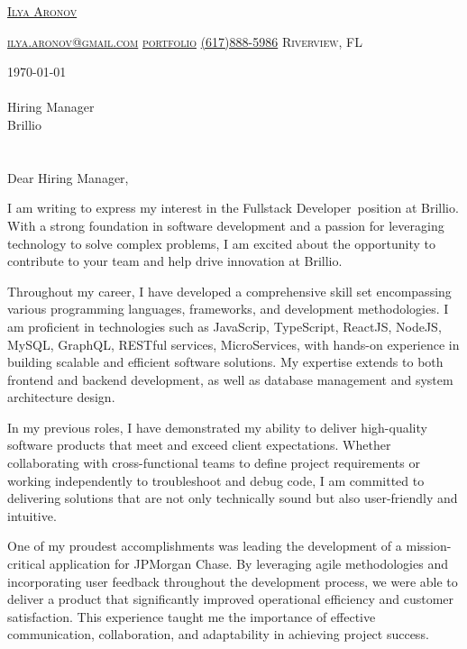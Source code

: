 \documentclass[11pt]{letter}
\makeatletter
\def\myname{Ilya Aronov}
\def\myemail{ilya.aronov@gmail.com}
\def\mylinkedin{ilya-aronov-b488a965}
\def\portfolio{https://imaronov.github.io/}
\def\myphone{(617)888-5986}
\def\mylocation{Riverview, FL}
\def\previousCompany{JPMorgan Chase}
\def\possitionApplied{Fullstack Developer}
\def\hiringManager{Hiring Manager}
\def\companyName{Brillio}
\def\companyAddress{}
\def\companyCity{}
\def\companySkills{JavaScrip, TypeScript, ReactJS, NodeJS, MySQL, GraphQL, RESTful services, MicroServices}
\newcommand{\addressHeading}[4]{
    {#1}\\
    {#2}\\
    {#3}\\
    {#4}\\
}
\newcommand{\greeting}{
    \vspace{-0.1in}Dear \hiringManager,
}
\makeatother
\begin{document}
\AddToShipoutPictureBG{%
\color{gr}
\AtPageUpperLeft{\rule[-1.3in]{\paperwidth}{1.3in}}
}

\begin{center}
{\fontsize{28}{0}\selectfont\scshape \href{https://linkedin.com/in/\mylinkedin}{\myname} }

\fontsize{10}{0}\selectfont\scshape \href{mailto:\myemail}{\faEnvelope\enspace \myemail}\hfill
\fontsize{10}{0}\selectfont\scshape \href{\portfolio}{\faUser\enspace portfolio}\hfill
\fontsize{10}{0}\selectfont\scshape \href{tel:\myphone}{\faPhone\enspace \myphone}\hfill
\fontsize{10}{0}\selectfont\scshape \faMapMarker\enspace \mylocation
\end{center}

\vspace{0.2in}

\today
\\ \\
\addressHeading{\hiringManager}{\companyName}{\companyAddress}{\companyCity}

\greeting

I am writing to express my interest in the \possitionApplied\, position at \companyName.
With a strong foundation in software development and a passion for leveraging technology to solve complex problems,
I am excited about the opportunity to contribute to your team and help drive innovation at \companyName.

Throughout my career, I have developed a comprehensive skill set encompassing various programming languages, frameworks, and development methodologies.
I am proficient in technologies such as \companySkills, with hands-on experience in building scalable and efficient software solutions.
My expertise extends to both frontend and backend development, as well as database management and system architecture design.

In my previous roles, I have demonstrated my ability to deliver high-quality software products that meet and exceed client expectations.
Whether collaborating with cross-functional teams to define project requirements or working independently to troubleshoot and debug code,
I am committed to delivering solutions that are not only technically sound but also user-friendly and intuitive.

One of my proudest accomplishments was leading the development of a mission-critical application for \previousCompany.
By leveraging agile methodologies and incorporating user feedback throughout the development process, we were able to deliver a product that significantly improved operational efficiency and customer satisfaction.
This experience taught me the importance of effective communication, collaboration, and adaptability in achieving project success.
\end{document}

